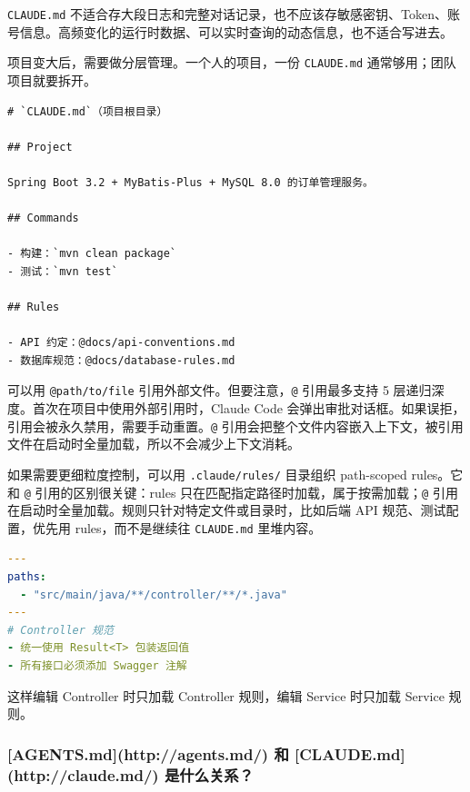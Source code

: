 \documentclass[9pt,a4paper,twocolumn]{ctexart}
\begin{document}
\texttt{CLAUDE.md} 不适合存大段日志和完整对话记录，也不应该存敏感密钥、Token、账号信息。高频变化的运行时数据、可以实时查询的动态信息，也不适合写进去。



项目变大后，需要做分层管理。一个人的项目，一份 \texttt{CLAUDE.md} 通常够用；团队项目就要拆开。



\begin{lstlisting}
# `CLAUDE.md`（项目根目录）

## Project

Spring Boot 3.2 + MyBatis-Plus + MySQL 8.0 的订单管理服务。

## Commands

- 构建：`mvn clean package`
- 测试：`mvn test`

## Rules

- API 约定：@docs/api-conventions.md
- 数据库规范：@docs/database-rules.md
\end{lstlisting}



可以用 \texttt{@path/to/file} 引用外部文件。但要注意，\texttt{@} 引用最多支持 5 层递归深度。首次在项目中使用外部引用时，Claude Code 会弹出审批对话框。如果误拒，引用会被永久禁用，需要手动重置。\texttt{@} 引用会把整个文件内容嵌入上下文，被引用文件在启动时全量加载，所以不会减少上下文消耗。



如果需要更细粒度控制，可以用 \texttt{.claude/rules/} 目录组织 path-scoped rules。它和 \texttt{@} 引用的区别很关键：rules 只在匹配指定路径时加载，属于按需加载；\texttt{@} 引用在启动时全量加载。规则只针对特定文件或目录时，比如后端 API 规范、测试配置，优先用 rules，而不是继续往 \texttt{CLAUDE.md} 里堆内容。



\begin{lstlisting}[language=yaml]
---
paths:
  - "src/main/java/**/controller/**/*.java"
---
# Controller 规范
- 统一使用 Result<T> 包装返回值
- 所有接口必须添加 Swagger 注解
\end{lstlisting}



这样编辑 Controller 时只加载 Controller 规则，编辑 Service 时只加载 Service 规则。



\subsubsection{[AGENTS.md](http://agents.md/) 和 [CLAUDE.md](http://claude.md/) 是什么关系？}
\end{document}
